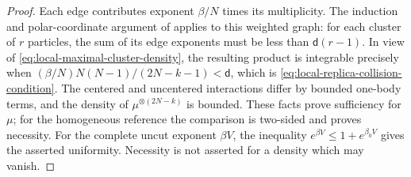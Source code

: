 \documentclass[11pt,reqno]{amsart}
\numberwithin{equation}{section}
\theoremstyle{plain}
\theoremstyle{definition}
\renewcommand{\d}{\mathsf d}
\newcommand{\be}{\beta}
\begin{document}
\begin{proof}
Each edge contributes exponent $\be/N$ times its multiplicity. The induction and polar-coordinate argument of  applies to this weighted graph: for each cluster of $r$ particles, the sum of its edge exponents must be less than $\d(r-1)$. In view of \eqref{eq:local-maximal-cluster-density}, the resulting product is integrable precisely when $(\be/N)N(N-1)/(2N-k-1)<\d$, which is \eqref{eq:local-replica-collision-condition}. The centered and uncentered interactions differ by bounded one-body terms, and the density of $\mu^{\otimes(2N-k)}$ is bounded. These facts prove sufficiency for $\mu$; for the homogeneous reference the comparison is two-sided and proves necessity. For the complete uncut exponent $\be V$, the inequality $e^{\be V}\leq1+e^{\be_0V}$ gives the asserted uniformity. Necessity is not asserted for a density which may vanish.
\end{proof}
\end{document}
